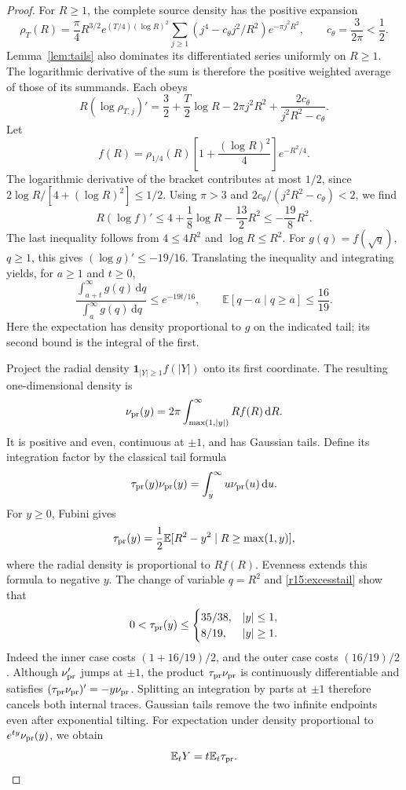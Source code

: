 \documentclass[11pt]{article}
\numberwithin{equation}{section}
\newcommand{\dd}{\,\mathrm d}
\begin{document}
\begin{proof}
For $R\ge1$, the complete source density has the positive expansion
\[
 \rho_T(R)=\frac\pi4R^{3/2}e^{(T/4)(\log R)^2}
 \sum_{j\ge1}(j^4-c_\theta j^2/R^2)e^{-\pi j^2R^2},
 \qquad c_\theta=\frac3{2\pi}<\frac12.
\]
Lemma~\ref{lem:tails} also dominates its differentiated series uniformly
on $R\ge1$. The logarithmic derivative of the sum is therefore the
positive weighted average of those of its summands. Each obeys
\[
 R(\log\rho_{T,j})'
 =\frac32+\frac T2\log R-2\pi j^2R^2
             +\frac{2c_\theta}{j^2R^2-c_\theta}.
\]
Let
\[
 f(R)=\rho_{1/4}(R)\left[1+\frac{(\log R)^2}{4}\right]e^{-R^2/4}.
\]
The logarithmic derivative of the bracket contributes at most $1/2$,
since $2\log R/[4+(\log R)^2]\le1/2$. Using $\pi>3$ and
$2c_\theta/(j^2R^2-c_\theta)<2$, we find
\begin{equation}\label{r15:sourcelogslope}
 R(\log f)'\le4+\frac18\log R-\frac{13}{2}R^2
             \le-\frac{19}{8}R^2.
\end{equation}
The last inequality follows from $4\le4R^2$ and $\log R\le R^2$.
For $g(q)=f(\sqrt q)$, $q\ge1$, this gives $(\log g)'\le-19/16$.
Translating the inequality and integrating yields, for $a\ge1$ and $t\ge0$,
\begin{equation}\label{r15:excesstail}
 \frac{\int_{a+t}^{\infty}g(q)\dd q}{\int_a^{\infty}g(q)\dd q}
 \le e^{-19t/16},\qquad
 \mathbb E[q-a\mid q\ge a]\le\frac{16}{19}.
\end{equation}
Here the expectation has density proportional to $g$ on the indicated
tail; its second bound is the integral of the first.

Project the radial density $\mathbf1_{|Y|\ge1}f(|Y|)$ onto its first
coordinate. The resulting one-dimensional density is
\[
 \nu_{\rm pr}(y)=2\pi\int_{\max(1,|y|)}^\infty Rf(R)\dd R.
\]
It is positive and even, continuous at $\pm1$, and has Gaussian tails.
Define its integration factor by the classical tail formula
\cite{SteinKernelRef}
\[
 \tau_{\rm pr}(y)\nu_{\rm pr}(y)
       =\int_y^\infty u\nu_{\rm pr}(u)\dd u.
\]
For $y\ge0$, Fubini gives
\[
 \tau_{\rm pr}(y)
 =\frac12\mathbb E[R^2-y^2\mid R\ge\max(1,y)],
\]
where the radial density is proportional to $Rf(R)$. Evenness extends
this formula to negative $y$. The change of variable $q=R^2$ and
\eqref{r15:excesstail} show that
\begin{equation}\label{r15:steinbounds}
 0<\tau_{\rm pr}(y)\le
 \begin{cases}
 35/38,& |y|\le1,\\
 8/19,& |y|\ge1.
 \end{cases}
\end{equation}
Indeed the inner case costs $(1+16/19)/2$, and the outer case costs
$(16/19)/2$. Although $\nu_{\rm pr}'$ jumps at $\pm1$, the product
$\tau_{\rm pr}\nu_{\rm pr}$ is continuously differentiable and satisfies
$(\tau_{\rm pr}\nu_{\rm pr})'=-y\nu_{\rm pr}$. Splitting an integration
by parts at $\pm1$ therefore cancels both internal traces. Gaussian
tails remove the two infinite endpoints even after exponential tilting.
For expectation under density proportional to $e^{ty}\nu_{\rm pr}(y)$,
we obtain
\[
 \mathbb E_tY=t\mathbb E_t\tau_{\rm pr}.
\]


\end{proof}
\end{document}
